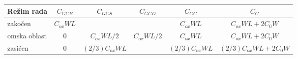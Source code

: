 \begingroup\renewcommand{\arraystretch}{1.22}\setlength{\tabcolsep}{3pt}
\begin{tabular}{lccccc}\toprule
Režim rada & $C_{GCB}$ & $C_{GCS}$ & $C_{GCD}$ & $C_{GC}$ & $C_G$\\\midrule
zakočen & $C_{ox}WL$ & & & $C_{ox}WL$ & $C_{ox}WL+2C_0W$\\
omska oblast & 0 & $C_{ox}WL/2$ & $C_{ox}WL/2$ & $C_{ox}WL$ & $C_{ox}WL+2C_0W$\\
zasićen & 0 & $(2/3)C_{ox}WL$ & & $(2/3)C_{ox}WL$ & $(2/3)C_{ox}WL+2C_0W$\\\bottomrule
\end{tabular}\endgroup
